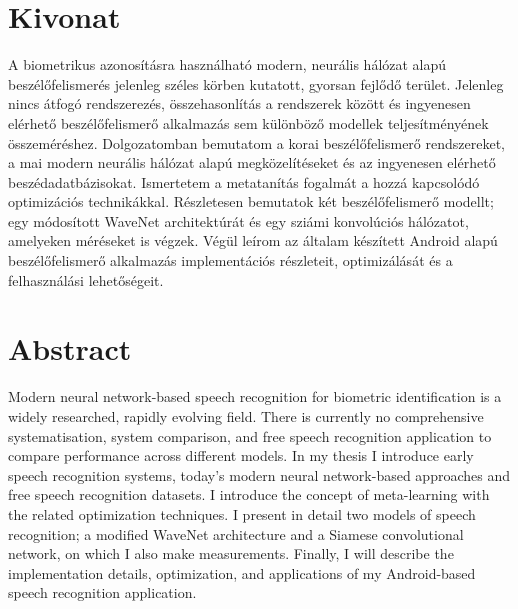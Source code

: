 \setcounter{page}{1}

\selecthungarian

\chapter*{Kivonat}

A biometrikus azonosításra használható modern, neurális hálózat alapú beszélőfelismerés jelenleg széles körben kutatott, gyorsan fejlődő terület. Jelenleg nincs átfogó rendszerezés, összehasonlítás a rendszerek között és ingyenesen elérhető beszélőfelismerő alkalmazás sem különböző modellek teljesítményének összeméréshez.
\newline
\newline
Dolgozatomban bemutatom a korai beszélőfelismerő rendszereket, a mai modern neurális hálózat alapú megközelítéseket és az ingyenesen elérhető beszédadatbázisokat. Ismertetem a metatanítás fogalmát a hozzá kapcsolódó optimizációs technikákkal. Részletesen bemutatok két beszélőfelismerő modellt; egy módosított WaveNet architektúrát és egy sziámi konvolúciós hálózatot, amelyeken méréseket is végzek. Végül leírom az általam készített Android alapú beszélőfelismerő alkalmazás implementációs részleteit, optimizálását és a felhasználási lehetőségeit.


\vfill
\selectenglish


\chapter*{Abstract}

Modern neural network-based speech recognition for biometric identification is a widely researched, rapidly evolving field. There is currently no comprehensive systematisation, system comparison, and free speech recognition application to compare performance across different models.
\newline
\newline
In my thesis I introduce early speech recognition systems, today's modern neural network-based approaches and free speech recognition datasets. I introduce the concept of meta-learning with the related optimization techniques. I present in detail two models of speech recognition; a modified WaveNet architecture and a Siamese convolutional network, on which I also make measurements. Finally, I will describe the implementation details, optimization, and applications of my Android-based speech recognition application.


\vfill
\selectthesislanguage

\setcounter{romanPage}{\value{page}}
